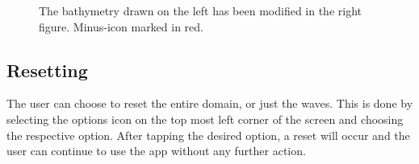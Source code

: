\documentclass[11pt,a4paper]{article}
\begin{document}
\begin{figure}[H]
\vspace{2cm}
\caption{
The bathymetry drawn on the left has been modified in the right figure.
Minus-icon marked in red.
}
\end{figure}


\subsection{Resetting}
The user can choose to reset the entire domain, or just the waves. This is done by selecting the options icon on the top most left corner of the screen and choosing the respective option. After tapping the desired option, a reset will occur and the user can continue to use the app without any further action.
\end{document}

